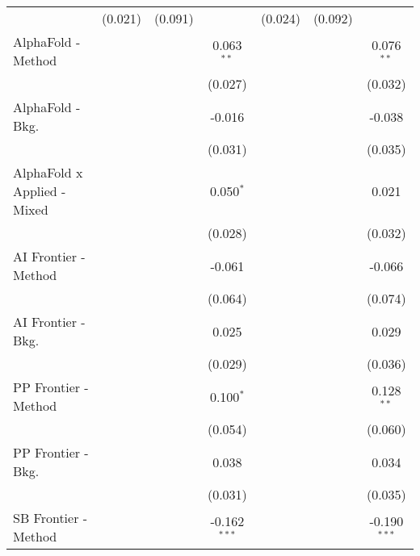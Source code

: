 \begin{tabular}{lcccccc}
                                  & (0.021)      & (0.091)        &                & (0.024) & (0.092)        &   \\   
   AlphaFold - Method             &              &                & 0.063$^{**}$   &         &                & 0.076$^{**}$\\   
                                  &              &                & (0.027)        &         &                & (0.032)\\   
   AlphaFold - Bkg.               &              &                & -0.016         &         &                & -0.038\\   
                                  &              &                & (0.031)        &         &                & (0.035)\\   
   AlphaFold x Applied - Mixed    &              &                & 0.050$^{*}$    &         &                & 0.021\\   
                                  &              &                & (0.028)        &         &                & (0.032)\\   
   AI Frontier - Method           &              &                & -0.061         &         &                & -0.066\\   
                                  &              &                & (0.064)        &         &                & (0.074)\\   
   AI Frontier - Bkg.             &              &                & 0.025          &         &                & 0.029\\   
                                  &              &                & (0.029)        &         &                & (0.036)\\   
   PP Frontier - Method           &              &                & 0.100$^{*}$    &         &                & 0.128$^{**}$\\   
                                  &              &                & (0.054)        &         &                & (0.060)\\   
   PP Frontier - Bkg.             &              &                & 0.038          &         &                & 0.034\\   
                                  &              &                & (0.031)        &         &                & (0.035)\\   
   SB Frontier - Method           &              &                & -0.162$^{***}$ &         &                & -0.190$^{***}$\\   

\end{tabular}
